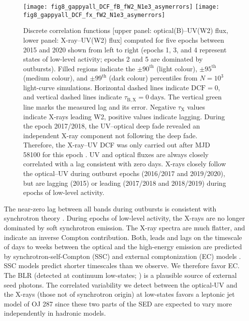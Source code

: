 \documentclass[preprints,article,accept,moreauthors,pdftex]{Definitions/mdpi}
\begin{document}
{\begin{figure}
\texttt{[image: fig8\_gappyall\_DCF\_fB\_fW2\_N1e3\_asymerrors]}
\texttt{[image: fig8\_gappyall\_DCF\_fx\_fW2\_N1e3\_asymerrors]}
\caption{Discrete correlation functions [upper panel: optical(B)--UV(W2) flux, lower panel: X-ray--UV(W2) flux] computed for five epochs between 2015 and 2020 shown from left to right (epochs 1, 3, and 4 represent states of low-level activity; epochs 2 and 5 are dominated by outbursts).
Filled regions indicate the $\pm90^{\mathrm{th}}$ 
(light colour), $\pm95^{\mathrm{th}}$ (medium colour), and $\pm99^{\mathrm{th}}$ (dark colour) percentiles from $N=10^3$ light-curve simulations. 
Horizontal dashed lines indicate $\mathrm{DCF}=0$,
and vertical dashed lines indicate $\tau_{\mathrm{B,X}} = 0~\mathrm{days}$. The vertical green line marks the measured lag and its error. 
Negative $\tau_{\mathrm{X}}$ values indicate X-rays leading W2, positive values indicate lagging. 
During the epoch 2017/2018, the UV--optical deep fade revealed an independent X-ray component not following the deep fade. Therefore, the X-ray--UV DCF was only carried out after MJD 58100 
for this epoch \citep{Komossa2021c}.
UV and optical fluxes are always closely correlated with a lag consistent with zero days.  X-rays closely follow the optical--UV during outburst epochs (2016/2017 and 2019/2020), but are lagging (2015) or leading (2017/2018 and 2018/2019) during epochs of low-level activity. 
     }
     \label{fig:DCF}
\end{figure}

The near-zero lag between all bands during outbursts is consistent with synchrotron theory \citep{Kirk1998}. 
During epochs of low-level activity, the X-rays are no longer dominated by soft synchrotron emission. The X-ray spectra are much flatter, and indicate an inverse Compton contribution. Both, leads and lags on the timescale of days to weeks between the optical and the high-energy emission are predicted by synchrotron-self-Compton (SSC) and  external comptonization (EC) models \citep{Sokolov2004, Sikora2009}. SSC models predict shorter timescales than we observe. We therefore favor EC. The BLR (detected at continuum low-states; \citep{Nilsson2010}) is a plausible source of external seed photons.  
The correlated variability we detect between the  optical-UV and the X-rays (those not of synchrotron origin) at low-states favors a leptonic jet model of OJ 287 since these two parts of the SED are expected to vary more independently in hadronic models.

}
\end{document}

